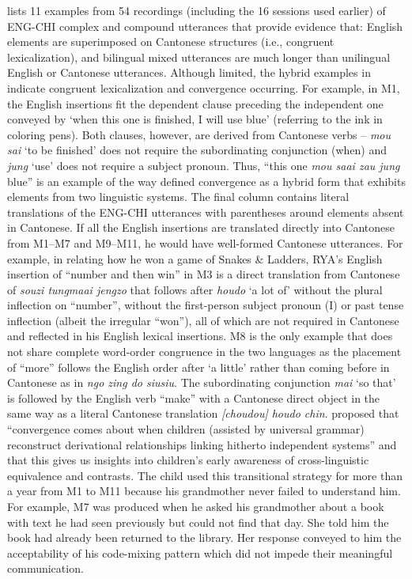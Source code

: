 \documentclass[output=paper,colorlinks,citecolor=brown]{langscibook}
\begin{document}
 lists 11 examples from 54 recordings (including the 16 sessions used earlier) of ENG-CHI complex and compound utterances that provide evidence that:  English elements are superimposed on Cantonese structures (i.e., congruent lexicalization), and  bilingual mixed utterances are much longer than unilingual English or Cantonese utterances. Although limited, the hybrid examples in  indicate congruent lexicalization and convergence occurring. For example, in M1, the English insertions fit the dependent clause preceding the independent one conveyed by ‘when this one is finished, I will use blue’ (referring to the ink in coloring pens). Both clauses, however, are derived from Cantonese verbs – \textit{mou sai} ‘to be finished’ does not require the subordinating conjunction (when) and \textit{jung} ‘use’ does not require a subject pronoun. Thus, “this one \textit{mou saai zau jung} blue” is an example of the way \citet{Clyne2003} defined convergence as a hybrid form that exhibits elements from two linguistic systems. The final column contains literal translations of the ENG-CHI utterances with parentheses around elements absent in Cantonese. If all the English insertions are translated directly into Cantonese from M1–M7 and M9–M11, he would have well-formed Cantonese utterances. For example, in relating how he won a game of Snakes \& Ladders, RYA’s English insertion of “number and then win” in M3 is a direct translation from Cantonese of \textit{souzi tungmaai jengzo} that follows after \textit{houdo} ‘a lot of’ without the plural inflection on “number”, without the first-person subject pronoun (I) or past tense inflection (albeit the irregular “won”), all of which are not required in Cantonese and reflected in his English lexical insertions. M8 is the only example that does not share complete word-order congruence in the two languages as the placement of “more” follows the English order after ‘a little’ rather than coming before in Cantonese as in \textit{ngo zing do siusiu}. The subordinating conjunction \textit{mai} ‘so that’ is followed by the English verb “make” with a Cantonese direct object in the same way as a literal Cantonese translation \textit{[choudou] houdo chin}.  \citet[277]{Gawlitzek-MaiwaldTracy2005} proposed that “convergence comes about when children (assisted by universal grammar) reconstruct derivational relationships linking hitherto independent systems” and that this gives us insights into children’s early awareness of cross-linguistic equivalence and contrasts. The child used this transitional strategy for more than a year from M1 to M11 because his grandmother never failed to understand him. For example, M7 was produced when he asked his grandmother about a book with text he had seen previously but could not find that day. She told him the book had already been returned to the library. Her response conveyed to him the acceptability of his code-mixing pattern which did not impede their meaningful communication.
\end{document}

